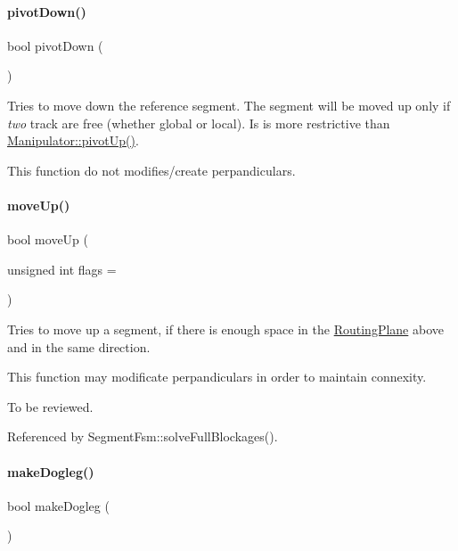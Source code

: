 \paragraph{\texorpdfstring{pivot\+Down()}{pivotDown()}}
{\footnotesize\ttfamily bool pivot\+Down (\begin{DoxyParamCaption}{ }\end{DoxyParamCaption})}

Tries to move down the reference segment. The segment will be moved up only if {\itshape two} track are free (whether global or local). Is is more restrictive than \mbox{\hyperlink{classKite_1_1Manipulator_ad590137c4e7e8d5ad2a6f510e0d70e81}{Manipulator\+::pivot\+Up()}}.

This function do not modifies/create perpandiculars. \mbox{\label{classKite_1_1Manipulator_ac954731e16188acb6984f348bf2d9d20}} 
\paragraph{\texorpdfstring{move\+Up()}{moveUp()}}
{\footnotesize\ttfamily bool move\+Up (\begin{DoxyParamCaption}\item[{unsigned int}]{flags = {} }\end{DoxyParamCaption})}

Tries to move up a segment, if there is enough space in the \mbox{\hyperlink{classKite_1_1RoutingPlane}{Routing\+Plane}} above and in the same direction.

This function may modificate perpandiculars in order to maintain connexity.

To be reviewed. 

Referenced by Segment\+Fsm\+::solve\+Full\+Blockages().

\mbox{\label{classKite_1_1Manipulator_af4d93a43ea18ae124da71072c66d1e0a}} 
\paragraph{\texorpdfstring{make\+Dogleg()}{makeDogleg()}\hspace{0.1cm}{\footnotesize\ttfamily [1/3]}}
{\footnotesize\ttfamily bool make\+Dogleg (\begin{DoxyParamCaption}{ }\end{DoxyParamCaption})}

